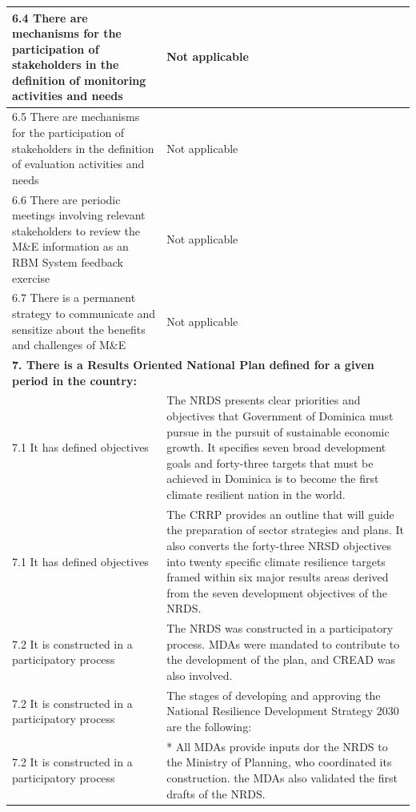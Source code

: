 \documentclass[
  10pt,
]{book}
\begin{document}
\begin{table}
\begin{tabular}[t]{l|l}
\hline
\hspace{1em}6.4 There are mechanisms for the participation of stakeholders in the definition of monitoring activities and needs & Not applicable\\
\hline
\hspace{1em}6.5 There are mechanisms for the participation of stakeholders in the definition of evaluation activities and needs & Not applicable\\
\hline
\hspace{1em}6.6 There are periodic meetings involving relevant stakeholders to review the M\&E information as an RBM System feedback exercise & Not applicable\\
\hline
\hspace{1em}6.7 There is a permanent strategy to communicate and sensitize about the benefits and challenges of M\&E & Not applicable\\
\hline
\multicolumn{2}{l}{\textbf{7. There is a Results Oriented National Plan defined for a given period in the country:}}\\
\hline
\hspace{1em}7.1 It has defined objectives & The NRDS presents clear priorities and objectives that Government of Dominica must pursue in the pursuit of sustainable economic growth. It specifies seven broad development goals and forty-three targets that must be achieved in Dominica is to become the first climate resilient nation in the world.\\
\hline
\hspace{1em}7.1 It has defined objectives & The CRRP provides an outline that will guide the preparation of sector strategies and plans. It also converts the forty-three NRSD objectives into twenty specific climate resilience targets framed within six major results areas derived from the seven development objectives of the NRDS.\\
\hline
\hspace{1em}7.2 It is constructed in a participatory process & The NRDS was constructed in a participatory process. MDAs were mandated to contribute to the development of the plan, and CREAD was also involved.\\
\hline
\hspace{1em}7.2 It is constructed in a participatory process & The stages of developing and approving the National Resilience Development Strategy 2030 are the following:\\
\hline
\hspace{1em}7.2 It is constructed in a participatory process & * All MDAs provide inputs dor the NRDS to the Ministry of Planning, who coordinated its construction. the MDAs also validated the first drafts of the NRDS.\\

\end{tabular}
\end{table}
\end{document}
